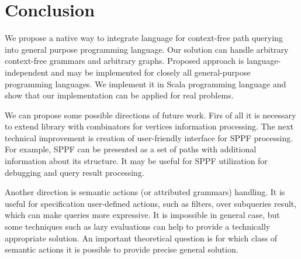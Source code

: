 \section{Conclusion}

We propose a native way to integrate language for context-free path querying into general purpose programming language.
Our solution can handle arbitrary context-free grammars and arbitrary graphs.
Proposed approach is language-independent and may be implemented for closely all general-purpose programming languages.
We implement it in Scala programming language and show that our implementation can be applied for real problems.

We can propose some possible directions of future work.
Firs of all it is necessary to extend library with combinators for vertices information processing.
The next technical improvement is creation of user-friendly interface for SPPF processing.
For example, SPPF can be presented as a set of paths with additional information about its structure.
It may be useful for SPPF utilization for debugging and query result processing.

Another direction is semantic actions (or attributed grammars) handling.
It is useful for specification user-defined actions, such as filters, over subqueries result, which can make queries more expressive.
It is impossible in general case, but some techniques such as lazy evaluations can help to provide a technically appropriate solution.
An important theoretical question is for which class of semantic actions it is possible to provide precise general solution.

